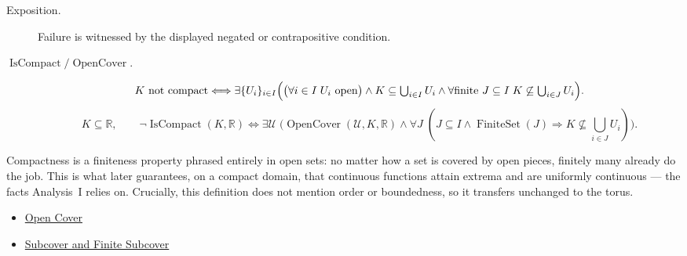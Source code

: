 \begin{remark*}
\begin{description}
  \item[Exposition.]
  Failure is witnessed by the displayed negated or contrapositive condition.

  \item[\(\operatorname{IsCompact} / \operatorname{OpenCover}.\)]
  \[
K \text{ not compact} \Longleftrightarrow \exists \{U_i\}_{i\in I}\Bigl(\bigl(\forall i\in I\;U_i \text{ open}\bigr)\land K\subseteq\textstyle\bigcup_{i\in I}U_i \land \forall \text{finite } J\subseteq I\;K\not\subseteq\textstyle\bigcup_{i\in J}U_i\Bigr).
\]
\[
K\subseteq\mathbb{R},\qquad
\neg\operatorname{IsCompact}(K,\mathbb{R})
\Longleftrightarrow
\exists \mathcal{U}\;\bigl(\operatorname{OpenCover}(\mathcal{U},K,\mathbb{R})
\land \forall J\;(J\subseteq I\land \operatorname{FiniteSet}(J)
\Longrightarrow K\not\subseteq\textstyle\bigcup_{i\in J}U_i)\bigr).
\]
\end{description}
\end{remark*}
\begin{remark*}[Interpretation]
Compactness is a finiteness property phrased entirely in open sets: no matter how a set is covered by open pieces, finitely many already do the job. This is what later guarantees, on a compact domain, that continuous functions attain extrema and are uniformly continuous --- the facts Analysis~I relies on. Crucially, this definition does not mention order or boundedness, so it transfers unchanged to the torus.
\end{remark*}
\begin{dependencies}
\begin{itemize}
  \item \hyperref[def:real-open-cover]{Open Cover}
  \item \hyperref[def:finite-subcover]{Subcover and Finite Subcover}
\end{itemize}
\end{dependencies}
